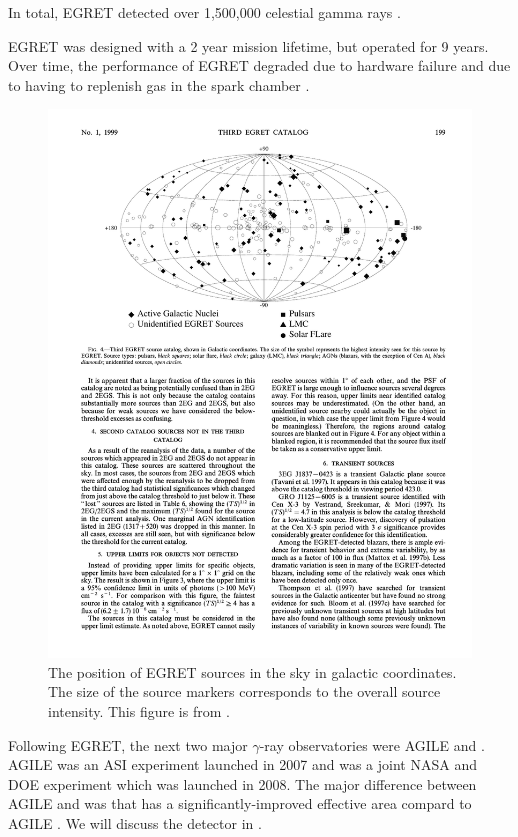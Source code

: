 In total, \ac{EGRET} detected over 1,500,000 celestial gamma rays \cite{thompson_2008a_gamma-astrophysics:}.

\ac{EGRET} was designed with a 2 year mission lifetime, but operated for 9 years.
Over time, the performance of \ac{EGRET} degraded due to hardware failure
and due to having to replenish gas in the spark chamber \cite{esposito_1999a_in-flight-calibration}.

\begin{figure}[htbp]
\centering
\includegraphics{chapters/introduction/figures/third_egret_catalog_sources.pdf}
\caption{The position of \ac{EGRET} sources in the sky in galactic
coordinates.  The size of the source markers corresponds to the overall
source intensity.  This figure is from \citep{hartman_1999a_third-egret}.}
\end{figure}

Following \ac{EGRET}, the next two major $\gamma$-ray observatories
were \ac{AGILE} \citep{pittori_2003a_gamma-ray-imaging}
and \fermi \citep{atwood_2009a_large-telescope}.
\ac{AGILE} was an \ac{ASI} experiment launched in 2007 and \fermi was a
joint \ac{NASA} and \ac{DOE} experiment which was launched in 2008.
The major difference between \ac{AGILE} and \fermi was that
\fermi has a significantly-improved effective area 
\citep[$9,500\unitspace\cm^2$,][]{atwood_2009a_large-telescope}
compard to \ac{AGILE} 
\citep[$\sim500\unitspace\cm^2$,][]{pittori_2003a_gamma-ray-imaging}.
We will discuss the \fermi detector in .
